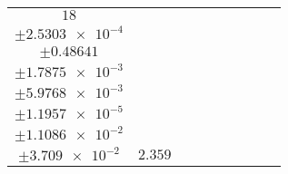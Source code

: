 \documentclass[8pt]{article}
\begin{document}
\begin{longtable}[l]{c c c c c c c c c}
$\num{18}$ & \begin{tabular}[c]{@{}c@{}}$\num{2.9946e-2}$ \\ $\pm\num{2.5303e-4}$\end{tabular} & \begin{tabular}[c]{@{}c@{}}$\num{0.71407}$ \\ $\pm\num{0.48641}$\end{tabular} & \begin{tabular}[c]{@{}c@{}}$\num{8.2068}$ \\ $\pm\num{1.7875e-3}$\end{tabular} & \begin{tabular}[c]{@{}c@{}}$\num{3.6349e+3}$ \\ $\pm\num{5.9768e-3}$\end{tabular} & \begin{tabular}[c]{@{}c@{}}$\num{7.2719}$ \\ $\pm\num{1.1957e-5}$\end{tabular} & \begin{tabular}[c]{@{}c@{}}$\num{1.1535}$ \\ $\pm\num{1.1086e-2}$\end{tabular} & \begin{tabular}[c]{@{}c@{}}$\num{4.2112}$ \\ $\pm\num{3.709e-2}$\end{tabular} & $\num{2.359}$\\
\bottomrule
\end{longtable}
\end{document}
